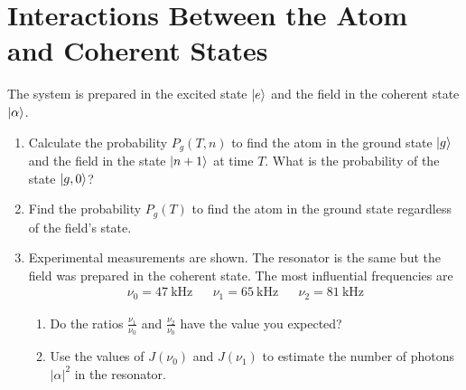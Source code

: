 \clearpage
\section{Interactions Between the Atom and Coherent States}
\begin{colbox}
    The system is prepared in the excited state $\ket{e}$ and the field in the coherent state $\ket{\alpha}$.
    \begin{enumerate}
        \item Calculate the probability $P_g(T,n)$ to find the atom in the ground state $\ket{g}$ and the field in the state $\ket{n+1}$ at time $T$. What is the probability of the state $\ket{g,0}$?
        \item Find the probability $P_g(T)$ to find the atom in the ground state regardless of the field's state.
        \item Experimental measurements are shown. The resonator is the same but the field was prepared in the coherent state. The most influential frequencies are 
        \begin{align}
            \nu_0=\qty{47}{\kilo\hertz} && \nu_1=\qty{65}{\kilo\hertz} && \nu_2=\qty{81}{\kilo\hertz}
        \end{align}
        \begin{enumerate}
            \item Do the ratios $\frac{\nu_1}{\nu_0}$ and $\frac{\nu_2}{\nu_0}$ have the value you expected?
            \item Use the values of $J(\nu_0)$ and $J(\nu_1)$ to estimate the number of photons $\lvert\alpha\rvert^2$ in the resonator.
        \end{enumerate}
    \end{enumerate}
\end{colbox}
